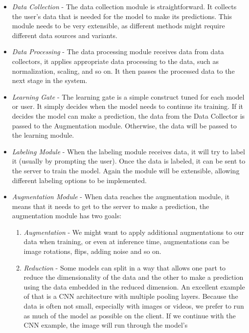 \documentclass[../main.tex]{subfiles}
\begin{document}
 
\begin{itemize}
    \item \emph{Data Collection} - The data collection module is straightforward. It collects the user's data that is needed for the model to make
        its predictions. This module needs to be very extensible, as different methods might require different data sources and variants.
    \item \emph{Data Processing} - The data processing module receives data from data collectors, it applies appropriate data processing to the data,
        such as normalization, scaling, and so on. It then passes the processed data to the next stage in the system.
    \item \emph{Learning Gate} - The learning gate is a simple construct tuned for each model or user. It simply decides when the model needs
        to continue its training. If it decides the model can make a prediction, the data from the Data Collector is passed to the
        Augmentation module. Otherwise, the data will be passed to the learning module.
    \item \emph{Labeling Module} - When the labeling module receives data, it will try to label it (usually by prompting the user).
        Once the data is labeled, it can be sent to the server to train the model. Again the module will be extensible,
        allowing different labeling options to be implemented.
    \item \emph{Augmentation Module} - When data reaches the augmentation module, it means that it needs to get to the server to make a prediction,
        the augmentation module has two goals:
        \begin{enumerate}[i]
            \item \emph{Augmentation} - We might want to apply additional augmentations to our data when training, or even at inference time,
                augmentations can be image rotations, flips, adding noise and so on.
            \item \emph{Reduction} - Some models can split in a way that allows one part to reduce the dimensionality of the data and the other to
                make a prediction using the data embedded in the reduced dimension. An excellent example of that is a CNN architecture with
                multiple pooling layers. Because the data is often not small, especially with images or videos, we prefer to run as
                much of the model as possible on the client. If we continue with the CNN example, the image will run through the model's

\end{enumerate}
\end{itemize}
\end{document}

